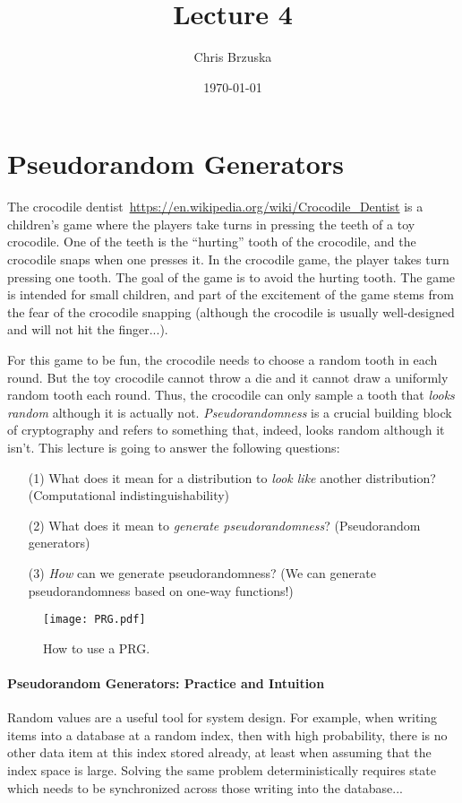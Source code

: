 \documentclass[a4paper,table,dvipsnames]{article}
\title{Lecture 4}
\author{Chris Brzuska}
\date{\today}
\theoremstyle{definition}
\begin{document}
\section{Pseudorandom Generators}
The crocodile dentist~\url{https://en.wikipedia.org/wiki/Crocodile_Dentist} is a children's game where the players take turns in pressing the teeth of a toy crocodile. One of the teeth is the ``hurting'' tooth of the crocodile, and the crocodile snaps when one presses it. In the crocodile game, the player takes turn pressing one tooth. The goal of the game is to avoid the hurting tooth. The game is intended for small children, and part of the excitement of the game stems from the fear of the crocodile snapping (although the crocodile is usually well-designed and will not hit the finger...). 

For this game to be fun, the crocodile needs to choose a random tooth in each round. But the toy crocodile cannot throw a die and it cannot draw a uniformly random tooth each round.
Thus, the crocodile can only sample a tooth that \emph{looks random} although it is actually not.
\emph{Pseudorandomness} is a crucial building block of cryptography and refers to something that,
indeed, looks random although it isn't. This lecture is going to answer the following
questions:
\begin{itemize}
\item[(1)] What does it mean for a distribution to \emph{look like} another distribution? (Computational indistinguishability)
\item[(2)] What does it mean to \emph{generate pseudorandomness}? (Pseudorandom generators)
\item[(3)] \emph{How} can we generate pseudorandomness? (We can generate pseudorandomness based on one-way functions!)
\end{itemize}


\begin{wrapfigure}{R}{0.5\textwidth}
\vspace{-0.3cm}
\begin{center}
\texttt{[image: PRG.pdf]}
\end{center}
\caption{How to use a PRG.}
\label{fig:prguse}
\vspace{-0.3cm}
\end{wrapfigure}

\paragraph{Pseudorandom Generators: Practice and Intuition}
Random values are a useful tool for system design. For example, when writing
items into a database at a random index, then with high probability, there is
no other data item at this index stored already, at least when assuming that 
the index space is large. Solving the same problem deterministically requires
state which needs to be synchronized across those writing into the database...
\end{document}
